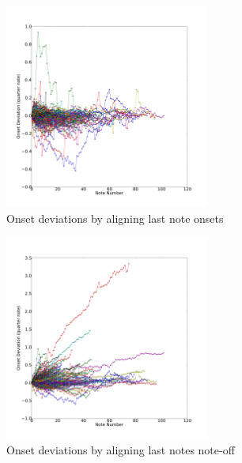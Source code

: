 \begin{figure}[tp]
   \begin{center}
      \includegraphics[width=0.6\textwidth]{fig/lian_onset_2}
   \end{center}
   \caption{Onset deviations by aligning last note onsets}
   \label{fig:norm1}
\end{figure}


\begin{figure}[tp]
   \begin{center}
      \includegraphics[width=0.6\textwidth]{fig/lian_onset_4}
   \end{center}
   \caption{Onset deviations by aligning last notes note-off}
   \label{fig:norm3}
\end{figure}

